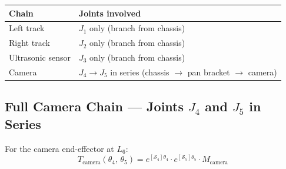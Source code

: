 \documentclass[12pt,a4paper]{article}
\begin{document}
\begin{center}
\renewcommand{\arraystretch}{1.2}
\begin{tabular}{L{3cm} L{11cm}}
\toprule
\textbf{Chain} & \textbf{Joints involved} \\
\midrule
Left track      & $J_1$ only (branch from chassis) \\
Right track     & $J_2$ only (branch from chassis) \\
Ultrasonic sensor & $J_3$ only (branch from chassis) \\
Camera          & $J_4 \to J_5$ in series (chassis $\to$ pan bracket $\to$ camera) \\
\bottomrule
\end{tabular}
\end{center}

\subsection{Full Camera Chain --- Joints $J_4$ and $J_5$ in Series}

For the camera end-effector at $L_6$:
\[
  T_{\text{camera}}(\theta_4,\,\theta_5)
  = e^{[\mathcal{S}_4]\theta_4}
    \cdot e^{[\mathcal{S}_5]\theta_5}
    \cdot M_{\text{camera}}
\]
\end{document}
